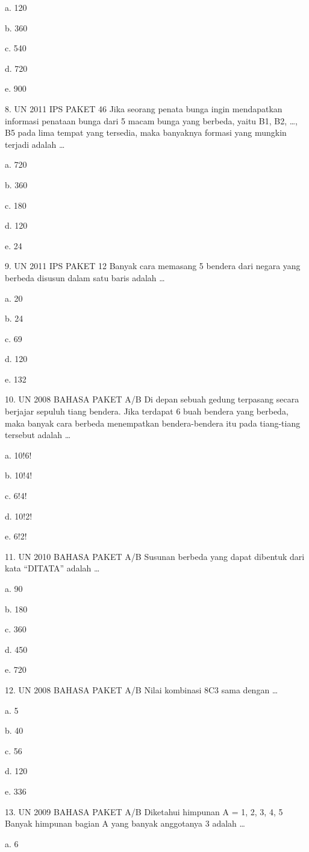 \documentclass[11pt,fleqn]{book} %
\begin{document}
a.	120

b.	360

c.	540

d.	720

e.	900

8.	UN 2011 IPS PAKET 46
Jika seorang penata bunga ingin mendapatkan informasi penataan bunga dari 5 macam bunga yang berbeda, yaitu B1, B2, …, B5 pada lima tempat yang tersedia, maka banyaknya formasi yang mungkin terjadi adalah …

a.	720

b.	360

c.	180

d.	120

e.	24

9.	UN 2011 IPS PAKET 12 
Banyak cara memasang 5 bendera dari negara yang berbeda disusun dalam satu baris adalah …

a.	20

b.	24

c.	69

d.	120

e.	132

10.	UN 2008 BAHASA PAKET A/B 
Di depan sebuah gedung terpasang secara berjajar sepuluh tiang bendera. Jika terdapat 6 buah bendera yang berbeda, maka banyak cara berbeda menempatkan bendera-bendera itu pada tiang-tiang tersebut adalah …

a.	10!6!

b.	10!4!

c.	6!4!

d.	10!2!

e.	6!2!

11.	UN 2010 BAHASA PAKET A/B 
Susunan berbeda yang dapat dibentuk dari kata “DITATA” adalah …

a.	90

b.	180

c.	360

d.	450

e.	720

12.	UN 2008 BAHASA PAKET A/B 
Nilai kombinasi 8C3 sama dengan …

a.	5

b.	40

c.	56

d.	120

e.	336

13.	UN 2009 BAHASA PAKET A/B 
Diketahui himpunan A = {1, 2, 3, 4, 5} Banyak himpunan bagian A yang banyak anggotanya 3 adalah …

a.	6
\end{document}
